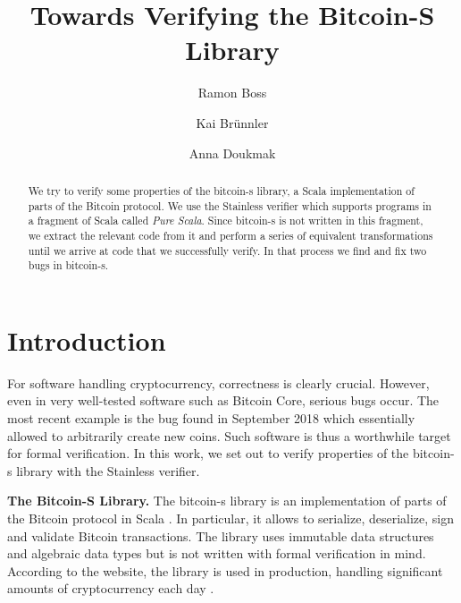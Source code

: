 \documentclass[runningheads]{llncs}
\renewcommand{\paragraph}{\textbf}%
\begin{document}
\title{Towards Verifying the Bitcoin-S Library}

\author{Ramon Boss \and Kai Brünnler \and Anna Doukmak}


\maketitle             

\begin{abstract}
  We try to verify some properties of the bitcoin-s library, a Scala
  implementation of parts of the Bitcoin protocol. We use the
  Stainless verifier which supports programs in a fragment of Scala
  called \emph{Pure Scala}. Since bitcoin-s is not written in this
  fragment, we extract the relevant code from it and perform a series
  of equivalent transformations until we arrive at code that we
  successfully verify. In that process we find and fix two bugs in
  bitcoin-s.

\end{abstract}



\section{Introduction}

For software handling cryptocurrency, correctness is clearly crucial.
However, even in very well-tested software such as Bitcoin Core,
serious bugs occur. The most recent example is the bug found in
September 2018 \cite{cve201817144} which essentially allowed to
arbitrarily create new coins. Such software is thus a worthwhile
target for formal verification. In this work, we set out to verify
properties of the bitcoin-s library with the Stainless verifier.

\paragraph{The Bitcoin-S Library.} The bitcoin-s library is an
implementation of parts of the Bitcoin protocol in Scala
\cite{BitcoinS:website,BitcoinS:github}. In particular, it allows to
serialize, deserialize, sign and validate Bitcoin transactions. The library
uses immutable data structures and algebraic data types but is not
written with formal verification in mind. According to the website,
the library is used in production, handling significant amounts of
cryptocurrency each day \cite{BitcoinS:website}.
\end{document}
